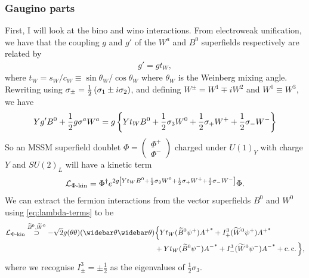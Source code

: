 \documentclass[english, notitlepage]{article}
\begin{document}
        \subsubsection{Gaugino parts}
            First, I will look at the bino and wino interactions. From electroweak
            unification, we have that the coupling $g$ and $g'$ of the $W^a$ and $B^0$
            superfields respectively are related by
            \begin{align}
                g' = g t_W,
            \end{align}
            where $t_W = s_W/c_W \equiv \sin\theta_W/\cos\theta_W$ where $\theta_W$ is the Weinberg mixing angle.
            Rewriting using $\sigma_\pm = \frac{1}{2}\left(\sigma_1 \pm i\sigma_2\right)$, and defining $W^\pm = W^1 \mp iW^2$ and $W^0 \equiv W^3$, we have
            \begin{align}
                Yg'B^0 + \frac{1}{2}g\sigma^a W^a = g\left\{ Yt_W B^0 + \frac{1}{2}\sigma_3 W^0 + \frac{1}{2}\sigma_+ W^+ + \frac{1}{2}\sigma_- W^- \right\}
            \end{align}
            So an MSSM superfield doublet $\Phi = \begin{pmatrix} \Phi^+ \\ \Phi^- \end{pmatrix}$ charged under ${U(1)}_Y$ with charge $Y$ and ${SU(2)}_L$ will have a kinetic term
            \begin{align}
                \mathcal{L}_{\Phi\text{-kin}} = \Phi^\dag e^{2g\left[ Yt_W B^0 + \frac{1}{2}\sigma_3 W^0 + \frac{1}{2}\sigma_+ W^+ + \frac{1}{2}\sigma_- W^- \right]} \Phi.
            \end{align}
            We can extract the fermion interactions from the vector superfields $B^0$ and $W^0$ using \cref{eq:lambda-terms} to be
            \begin{align} \nonumber
                \L_{\Phi\text{-kin}} \stackrel{\bino, \wino}{\supset} -\sqrt{2}g (\theta\theta)(\wbar\theta\wbar\theta) & \Big\{ Yt_W (\bino \psi^+) {A^+}^* + I^3_+ (\wino \psi^+) {A^+}^*       \\
                                                                                                                        & + Yt_W (\bino\psi^-){A^-}^* + I^3_- (\wino \psi^-){A^-}^* + \cc \Big\},
            \end{align}
            where we recognise $I^3_\pm = \pm \frac{1}{2}$ as the eigenvalues of $\frac{1}{2}\sigma_3$.
\end{document}
